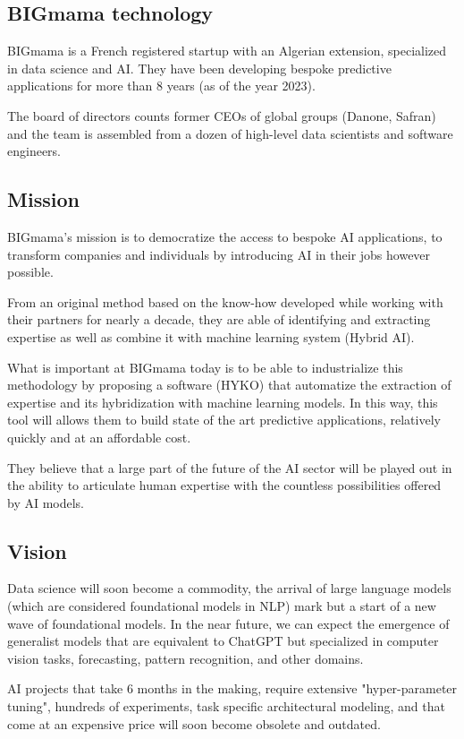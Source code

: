 \documentclass[a4paper,12pt]{article}
\begin{document}
\subsection{BIGmama technology}
BIGmama is a French registered startup with an Algerian extension, specialized in data science and AI. 
They have been developing bespoke predictive applications for more than 8 years (as of the year 2023).

The board of directors counts former CEOs of global groups (Danone, Safran) and the team is assembled from a dozen of high-level data scientists 
and software engineers.

\subsection{Mission}
BIGmama's mission is to democratize the access to bespoke AI applications, to transform companies and individuals by introducing AI in their jobs however possible. 

From an original method based on the know-how developed while working with their partners for nearly a decade, 
they are able of identifying and extracting expertise as well as combine it with machine learning system (Hybrid AI).

What is important at BIGmama today is to be able to industrialize this methodology by proposing a software (HYKO) that automatize the extraction of expertise and 
its hybridization with machine learning models. In this way, this tool will allows them to build state of the art predictive applications, relatively quickly and at an affordable cost.

They believe that a large part of the future of the AI sector will be played out in the ability to articulate human expertise with the countless possibilities offered by AI models.

\subsection{Vision}
Data science will soon become a commodity, the arrival of large language models (which are considered foundational models in NLP) mark but a start of a new wave of foundational models. In the near future, we can expect the emergence of generalist models that are equivalent to ChatGPT but specialized in computer vision tasks, forecasting, pattern recognition, and other domains.

AI projects that take 6 months in the making, require extensive "hyper-parameter tuning", hundreds of experiments, task specific architectural modeling, and that come at an expensive price will soon become obsolete and outdated.
\end{document}
